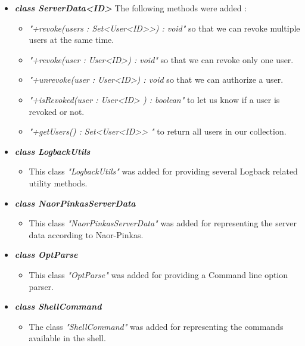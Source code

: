 \documentclass[a4paper,10pt]{scrartcl}
\begin{document}
\begin{itemize}
	\item \textbf{\textit{class ServerData<ID>}}\newline
	The following methods were added :
  \begin{itemize}
	 \item \textit{"+revoke(users : Set<User<ID>>) : void"} so that we can revoke multiple users at the same time.
	 \item \textit{"+revoke(user : User<ID>) : void"} so that we can revoke only one user.
	 \item \textit{"+unrevoke(user : User<ID>) : void} so that we can authorize a user.
	 \item \textit{"+isRevoked(user : User<ID> ) : boolean"} to let us know if a user is revoked or not.
	 \item \textit{"+getUsers() : Set<User<ID>> "} to return all users in our collection.
	\end{itemize}

   \item \textbf{\textit{class LogbackUtils}}
	\begin{itemize}
	 \item This class \textit{"LogbackUtils"} was added for providing several Logback related utility methods.
	\end{itemize}
	
	 \item \textbf{\textit{class NaorPinkasServerData}}
	\begin{itemize}
	 \item This class \textit{"NaorPinkasServerData"} was added for representing the server data according to Naor-Pinkas.
	\end{itemize}
	
	 \item \textbf{\textit{class OptParse}}
	\begin{itemize}
	 \item This class \textit{"OptParse"} was added for providing a Command line option parser.
	\end{itemize}
	
   \item \textit{\textbf{class ShellCommand}}
	\begin{itemize}
	 \item The class \textit{"ShellCommand"} was added for representing the commands available in the shell.
	\end{itemize}
	
\end{itemize}
\end{document}
